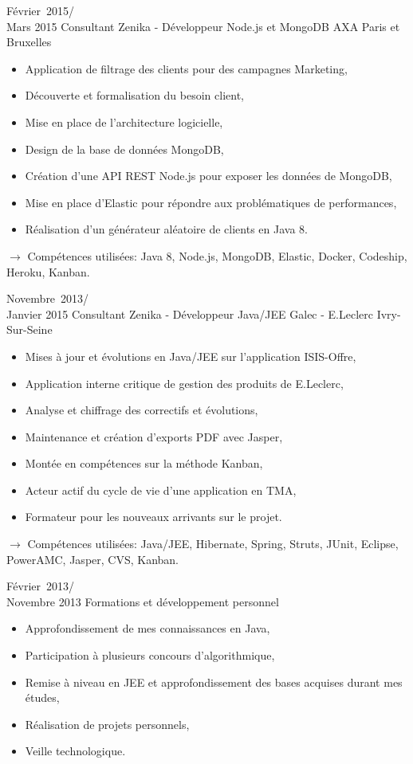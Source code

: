\documentclass[11pt,a4paper]{moderncv}
\begin{document}
\cventry
{Février\ 2015/\\Mars 2015}
{Consultant Zenika - Développeur Node.js et MongoDB}
{AXA}
{Paris et Bruxelles}
{}
{\begin{itemize}
\item Application de filtrage des clients pour des campagnes Marketing,
\item Découverte et formalisation du besoin client,
\item Mise en place de l'architecture logicielle,
\item Design de la base de données MongoDB,
\item Création d'une API REST Node.js pour exposer les données de MongoDB,
\item Mise en place d'Elastic pour répondre aux problématiques de performances,
\item Réalisation d'un générateur aléatoire de clients en Java 8.
\end{itemize}
$\rightarrow$ Compétences utilisées: Java 8, Node.js, MongoDB, Elastic, Docker, Codeship, Heroku, Kanban.
}   %

\cventry
{Novembre\ 2013/\\Janvier 2015}
{Consultant Zenika - Développeur Java/JEE}
{Galec - E.Leclerc}
{Ivry-Sur-Seine}
{}
{\begin{itemize}
\item Mises à jour et évolutions en Java/JEE sur l'application ISIS-Offre,
\item Application interne critique de gestion des produits de E.Leclerc,
\item Analyse et chiffrage des correctifs et évolutions,
\item Maintenance et création d'exports PDF avec Jasper,
\item Montée en compétences sur la méthode Kanban,
\item Acteur actif du cycle de vie d'une application en TMA,
\item Formateur pour les nouveaux arrivants sur le projet.
\end{itemize}
$\rightarrow$ Compétences utilisées: Java/JEE, Hibernate, Spring, Struts, JUnit, Eclipse, PowerAMC, Jasper, CVS, Kanban.
}   %

\cventry
{Février\ 2013/\\Novembre 2013}
{Formations et développement personnel}{}{}{}
{\begin{itemize}
\item Approfondissement de mes connaissances en Java,
\item Participation à plusieurs concours d'algorithmique,
\item Remise à niveau en JEE et approfondissement des bases acquises durant mes études,
\item Réalisation de projets personnels,
\item Veille technologique.
\end{itemize}
}   %
\end{document}
